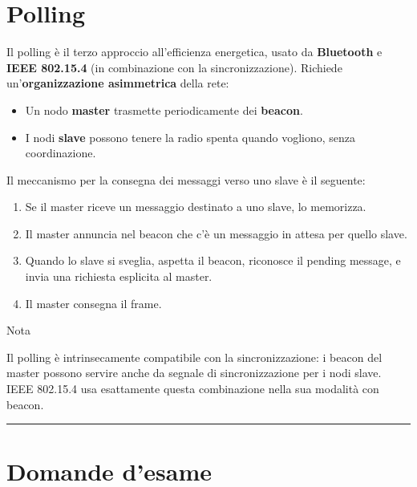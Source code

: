 \documentclass[
  italian,
  openany]{book}
\providecommand{\tightlist}{%
  \setlength{\itemsep}{0pt}\setlength{\parskip}{0pt}}
\begin{document}
\section{Polling}\label{polling}

Il polling è il terzo approccio all'efficienza energetica, usato da
\textbf{Bluetooth} e \textbf{IEEE 802.15.4} (in combinazione con la
sincronizzazione). Richiede un'\textbf{organizzazione asimmetrica} della
rete:

\begin{itemize}
\tightlist
\item
  Un nodo \textbf{master} trasmette periodicamente dei \textbf{beacon}.
\item
  I nodi \textbf{slave} possono tenere la radio spenta quando vogliono,
  senza coordinazione.
\end{itemize}

Il meccanismo per la consegna dei messaggi verso uno slave è il
seguente:

\begin{enumerate}
\def\labelenumi{\arabic{enumi}.}
\tightlist
\item
  Se il master riceve un messaggio destinato a uno slave, lo memorizza.
\item
  Il master annuncia nel beacon che c'è un messaggio in attesa per
  quello slave.
\item
  Quando lo slave si sveglia, aspetta il beacon, riconosce il pending
  message, e invia una richiesta esplicita al master.
\item
  Il master consegna il frame.
\end{enumerate}

\begin{calloutnote}{Nota}

Il polling è intrinsecamente compatibile con la sincronizzazione: i
beacon del master possono servire anche da segnale di sincronizzazione
per i nodi slave. IEEE 802.15.4 usa esattamente questa combinazione
nella sua modalità con beacon.

\end{calloutnote}

\begin{center}\rule{0.5\linewidth}{0.5pt}\end{center}

\section{Domande d'esame}\label{domande-desame}
\end{document}
